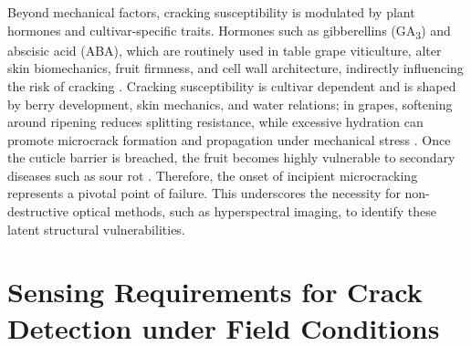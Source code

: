 \medskip
\noindent
Beyond mechanical factors, cracking susceptibility is modulated by plant hormones and cultivar-specific traits. Hormones such as gibberellins (GA\textsubscript{3}) and abscisic acid (ABA), which are routinely used in table grape viticulture, alter skin biomechanics, fruit firmness, and cell wall architecture, indirectly influencing the risk of cracking \parencite{Lichter2014, Castellarin2016}. Cracking susceptibility is cultivar dependent and is shaped by berry development, skin mechanics, and water relations; in grapes, softening around ripening reduces splitting resistance, while excessive hydration can promote microcrack formation and propagation under mechanical stress \parencite{Chang2019, Chang2021}. Once the cuticle barrier is breached, the fruit becomes highly vulnerable to secondary diseases such as sour rot \parencite{Hall2018}. Therefore, the onset of incipient microcracking represents a pivotal point of failure. This underscores the necessity for non-destructive optical methods, such as hyperspectral imaging, to identify these latent structural vulnerabilities.%

\section{Sensing Requirements for Crack Detection under Field Conditions}
\label{sec:advanced_sensing_need}

